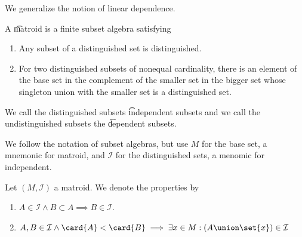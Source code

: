 

We generalize the notion of linear dependence.


A \t{matroid} is a finite subset algebra satisfying
  \begin{enumerate}
  \item Any subset of a distinguished set is distinguished.
  \item For two distinguished subsets of nonequal cardinality, there is an element of the base set in the complement of the smaller set in the bigger set whose singleton union with the smaller set is a distinguished set.
  \end{enumerate}
We call the distinguished subsets \t{independent subsets} and we call the undistinguished subsets the \t{dependent subsets}.


We follow the notation of subset algebras, but use $M$ for the base
set, a mnemonic for matroid, and $\mathcal{I}$ for the distinguished
sets, a menomic for independent.

Let $(M, \mathcal{I})$ a matroid.
We denote the properties by
\begin{enumerate}
  \item $A \in \mathcal{I} \land B \subset A \implies B \in \mathcal{I}$.
  \item $A, B \in \mathcal{I} \land \card{A} < \card{B} \implies \exists  x \in M: (A \union \set{x}) \in \mathcal{I}$
\end{enumerate}

\blankpage
